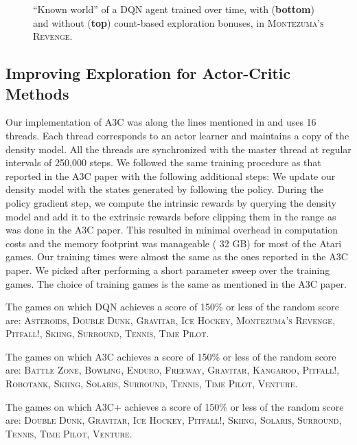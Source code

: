 \documentclass{article}
\newcommand{\gamename}[1]{\textsc{#1}}
\begin{document}
{\begin{figure*}
\caption{``Known world'' of a DQN agent trained over time, with (\textbf{bottom}) and without (\textbf{top}) count-based exploration bonuses, in \gamename{Montezuma's Revenge}.\label{fig:montezuma_revenge_all_maps}}
\end{figure*}

\subsection{Improving Exploration for Actor-Critic Methods}

Our implementation of A3C was along the lines mentioned in \cite{mnih16asynchronous} and uses 16 threads. Each thread corresponds to an actor learner and maintains a copy of the density model. All the threads are synchronized with the master thread at regular intervals of 250,000 steps. We followed the same training procedure as that reported in the A3C paper with the following additional steps:
We update our density model with the states generated by following the policy. During the policy gradient step, we compute the intrinsic rewards by querying the density model and add it to the extrinsic rewards before clipping them in the range  as was done in the A3C paper. This resulted in minimal overhead in computation costs and the memory footprint was manageable ( 32 GB) for most of the Atari games. Our training times were almost the same as the ones reported in the A3C paper.
We picked  after performing a short parameter sweep over the training games. The choice of training games is the same as mentioned in the A3C paper.

The games on which DQN achieves a score of 150\% or less of the random score are: \gamename{Asteroids}, \gamename{Double Dunk}, \gamename{Gravitar}, \gamename{Ice Hockey}, \gamename{Montezuma's Revenge}, \gamename{Pitfall!}, \gamename{Skiing}, \gamename{Surround}, \gamename{Tennis}, \gamename{Time Pilot}.

The games on which A3C achieves a score of 150\% or less of the random score are: \gamename{Battle Zone}, \gamename{Bowling}, \gamename{Enduro}, \gamename{Freeway}, \gamename{Gravitar}, \gamename{Kangaroo}, \gamename{Pitfall!}, \gamename{Robotank}, \gamename{Skiing}, \gamename{Solaris}, \gamename{Surround}, \gamename{Tennis}, \gamename{Time Pilot}, \gamename{Venture}.

The games on which A3C+ achieves a score of 150\% or less of the random score are: \gamename{Double Dunk}, \gamename{Gravitar}, \gamename{Ice Hockey}, \gamename{Pitfall!}, \gamename{Skiing}, \gamename{Solaris}, \gamename{Surround}, \gamename{Tennis}, \gamename{Time Pilot}, \gamename{Venture}.

}
\end{document}
